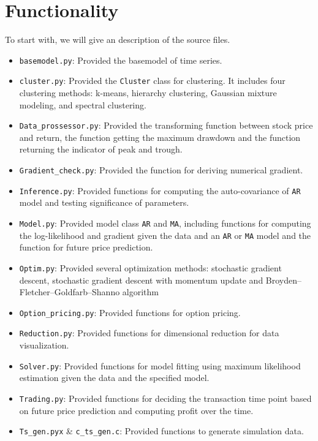 \documentclass[12pt,a4paper]{article}
\begin{document}
\section{Functionality}
To start with, we will give an description of the source files.
\begin{itemize}
\item \texttt{basemodel.py}: Provided the basemodel of time series.
\item \texttt{cluster.py}:  Provided the \texttt{Cluster} class for clustering. It includes four clustering methods: k-means, hierarchy clustering, Gaussian mixture modeling, and spectral clustering.
\item \texttt{Data\_prossessor.py}:  Provided the transforming function between stock price and return, the function getting the maximum drawdown and the function returning the indicator of peak and trough.

\item \texttt{Gradient\_check.py}: Provided the function for deriving numerical gradient.

\item \texttt{Inference.py}: Provided functions for computing the auto-covariance of \texttt{AR} model and testing significance of parameters.

\item \texttt{Model.py}: Provided model class \texttt{AR} and \texttt{MA}, including functions for computing the log-likelihood and gradient given the data and an \texttt{AR} or \texttt{MA} model and the function for future price prediction.

\item \texttt{Optim.py}: Provided several optimization methods: stochastic gradient descent, stochastic gradient descent with momentum update and Broyden–Fletcher–Goldfarb–Shanno algorithm

\item \texttt{Option\_pricing.py}: Provided functions for option pricing.

\item \texttt{Reduction.py}: Provided functions for dimensional reduction for data visualization.

\item \texttt{Solver.py}: Provided functions for model fitting using maximum likelihood estimation given the data and the specified model.

\item \texttt{Trading.py}: Provided functions for deciding the transaction time point based on future price prediction and computing profit over the time.

\item \texttt{Ts\_gen.pyx} \& \texttt{c\_ts\_gen.c}: Provided functions to generate simulation data.

\end{itemize}
\end{document}
